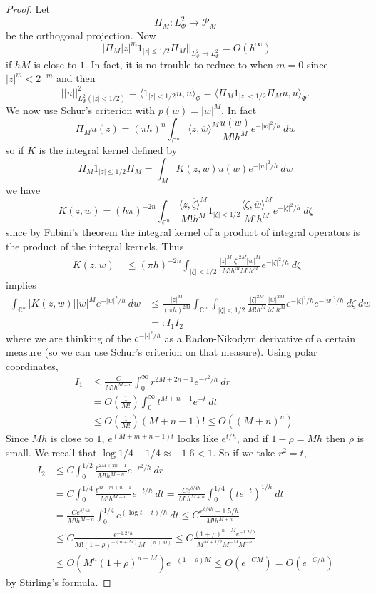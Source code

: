 \documentclass[12pt]{report}
\newcommand{\CC}{\mathbb{C}}
\theoremstyle{definition}
\begin{document}
\begin{proof}
    Let
    $$\Pi_M: L^2_\Phi \to \mathcal P_M$$
    be the orthogonal projection. Now
    $$||\Pi_M |z|^m 1_{|z| \leq 1/2} \Pi_M||_{L^2_\Phi \to L^2_\Phi} = O(h^\infty)$$
    if $hM$ is close to $1$. In fact, it is no trouble to reduce to when $m = 0$ since $|z|^m < 2^{-m}$ and then
    $$||u||_{L^2_\Phi(|z| < 1/2)}^2 = \langle 1_{|z| < 1/2}u, u\rangle_\Phi = \langle \Pi_M 1_{|z| < 1/2}\Pi_Mu, u\rangle_\Phi.$$
    We now use Schur's criterion with $p(w) = |w|^M$. In fact
    $$\Pi_Mu(z) = (\pi h)^n \int_{\CC^n} \langle z, \overline w\rangle^M\frac{u(w)}{M!h^M} e^{-|w|^2/h} ~dw$$
    so if $K$ is the integral kernel defined by
    $$\Pi_M1_{|z|\leq 1/2}\Pi_M = \int_M K(z, w) u(w) e^{-|w|^2/h} ~dw$$
    we have
    $$K(z, w) = (h\pi)^{-2n} \int_{\CC^n} \frac{\langle z, \overline \zeta\rangle^M}{M!h^M} 1_{|\zeta|<1/2} \frac{\langle \zeta, \overline w\rangle^M}{M!h^M} e^{-|\zeta|^2/h} ~d\zeta$$
    since by Fubini's theorem the integral kernel of a product of integral operators is the product of the integral kernels. Thus
\begin{align*}|K(z, w)| &\leq (\pi h)^{-2n} \int_{|\zeta|<1/2} \frac{|z|^M|\zeta|^{2M}|w|^M}{M!h^M M!h^M} e^{-|\zeta|^2/h} ~d\zeta
\end{align*}
    implies
\begin{align*}
    \int_{\CC^n} |K(z, w)| |w|^M e^{-|w|^2/h} ~dw &\leq \frac{|z|^M}{(\pi h)^{2M}} \int_{\CC^n} \int_{|\zeta| < 1/2} \frac{|\zeta|^{2M}}{M!h^M} \frac{|w|^{2M}}{M!h^M} e^{-|\zeta|^2/h} e^{-|w|^2/h} ~d\zeta ~dw\\
    &=: I_1I_2
\end{align*}
    where we are thinking of the $e^{-|\cdot|^2/h}$ as a Radon-Nikodym derivative of a certain measure (so we can use Schur's criterion on that measure). Using polar coordinates,
\begin{align*}I_1 &\leq \frac{C}{M!h^{M+n}} \int_0^\infty r^{2M+2n-1} e^{-r^2/h} ~dr\\
&= O\left(\frac{1}{M!}\right) \int_0^{\infty} t^{M+n-1} e^{-t} ~dt\\
&\leq O\left(\frac{1}{M!}\right) (M + n - 1)! \leq O((M + n)^n).
\end{align*}
    Since $Mh$ is close to $1$, $e^{(M+m+n-1)t}$ looks like $e^{t/h}$, and if $1 - \rho = Mh$ then $\rho$ is small. We recall that $\log 1/4 - 1/4 \approx -1.6 < 1$. So if we take $r^2 = t$,
\begin{align*}
    I_2 &\leq C\int_0^{1/2} \frac{r^{2M + 2n - 1}}{M!h^{M+n}} e^{-r^2/h} ~dr \\
    &= C\int_0^{1/4} \frac{t^{M+m+n-1}}{M!h^{M+n}} e^{-t/h} ~dt
    = \frac{Ce^{\delta/4h}}{M!h^{M+n}} \int_0^{1/4} (te^{-t})^{1/h} ~dt\\
    &= \frac{Ce^{\delta/4h}}{M!h^{M+n}} \int_0^{1/4} e^{(\log t - t)/h} ~dt
    \leq C\frac{e^{\delta/4h}-1.5/h}{M!h^{M+n}}\\
    &\leq C\frac{e^{-1.2/h}}{M!(1-\rho)^{-(n+M)}M^{-(n+M)}}
    \leq C\frac{(1+\rho)^{n+M}e^{-1.2/h}}{M^{M+1/2}M^{-M}M^{-n}}\\
    &\leq O(M^n (1 + \rho)^{n+M}) e^{-(1-\rho)M}
    \leq O(e^{-CM}) = O(e^{-C/h})
\end{align*}
    by Stirling's formula.
\end{proof}
\end{document}
